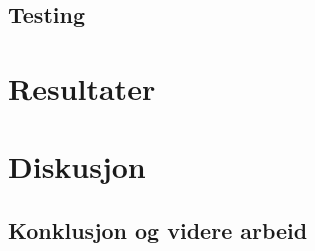 \documentclass[norsk]{uiobachelorthesis}
\begin{document}
\subsection{Testing}
\label{sec:testing}

\section{Resultater}
\label{sec:resultater}

\section{Diskusjon}
\label{sec:diskusjon}


\subsection{Konklusjon og videre arbeid}
\label{sec:konklusjon}

\printbibliography[title={Kilder}]
\end{document}
